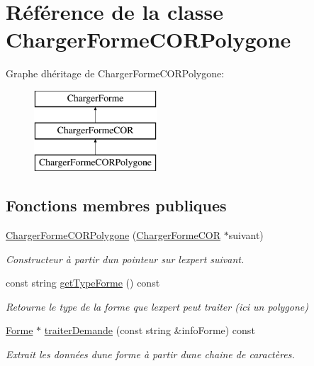 \hypertarget{class_charger_forme_c_o_r_polygone}{}\section{Référence de la classe Charger\+Forme\+C\+O\+R\+Polygone}
\label{class_charger_forme_c_o_r_polygone}
Graphe d\textquotesingle{}héritage de Charger\+Forme\+C\+O\+R\+Polygone\+:\begin{figure}[H]
\begin{center}
\leavevmode
\includegraphics[height=3.000000cm]{class_charger_forme_c_o_r_polygone}
\end{center}
\end{figure}
\subsection*{Fonctions membres publiques}
\begin{DoxyCompactItemize}
\item 
\mbox{\hyperlink{class_charger_forme_c_o_r_polygone_a177c7353e9c065436dda08540c675b23}{Charger\+Forme\+C\+O\+R\+Polygone}} (\mbox{\hyperlink{class_charger_forme_c_o_r}{Charger\+Forme\+C\+OR}} $\ast$suivant)
\begin{DoxyCompactList}\small\item\em Constructeur à partir d\textquotesingle{}un pointeur sur l\textquotesingle{}expert suivant. \end{DoxyCompactList}\item 
const string \mbox{\hyperlink{class_charger_forme_c_o_r_polygone_a8e702295e28572dc41020965255b847a}{get\+Type\+Forme}} () const
\begin{DoxyCompactList}\small\item\em Retourne le type de la forme que l\textquotesingle{}expert peut traiter (ici un polygone) \end{DoxyCompactList}\item 
\mbox{\hyperlink{class_forme}{Forme}} $\ast$ \mbox{\hyperlink{class_charger_forme_c_o_r_polygone_a4ce89ecdaa400d4930743a8e7204b5f2}{traiter\+Demande}} (const string \&info\+Forme) const
\begin{DoxyCompactList}\small\item\em Extrait les données d\textquotesingle{}une forme à partir d\textquotesingle{}une chaine de caractères. \end{DoxyCompactList}\end{DoxyCompactItemize}
